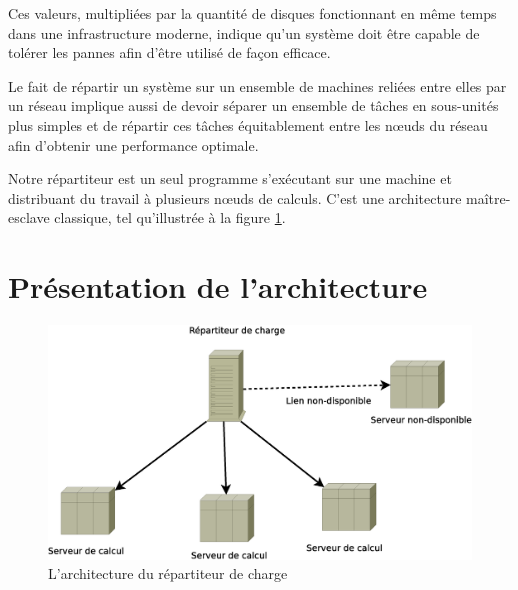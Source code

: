 
Ces valeurs, multipliées par la quantité de disques fonctionnant en même temps dans une infrastructure moderne, indique qu'un système doit
être capable de tolérer les pannes afin d'être utilisé de façon efficace. 

Le fait de répartir un système sur un ensemble de machines reliées entre elles par un réseau implique aussi de devoir séparer un ensemble de tâches en 
sous-unités plus simples et de répartir ces tâches équitablement entre les nœuds du réseau afin d'obtenir une performance optimale. 

Notre répartiteur est un seul programme s'exécutant sur une machine et distribuant du travail à plusieurs nœuds de calculs.
C'est une architecture maître-esclave classique, tel qu'illustrée à la figure \ref{fig:arch_1}.

\section{Présentation de l'architecture}

\begin{figure}
  \includegraphics[width=\linewidth]{Arch_Trad.eps}
  \caption{L'architecture du répartiteur de charge}
  \label{fig:arch_1}
\end{figure}



